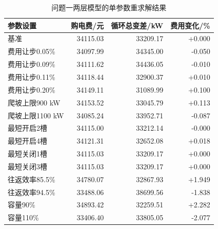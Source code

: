 \begin{table}[H]\centering
\caption{问题一两层模型的单参数重求解结果}\label{tab:q1-sensitivity-final}
\begin{tabular}{lrrr}\toprule
参数设置 & 购电费/元 & 循环总变差/kW & 费用变化/\%\\\midrule
基准 & 34115.03 & 33209.17 & +0.000 \\
费用让步0.05\% & 34097.99 & 34345.00 & -0.050 \\
费用让步0.09\% & 34111.62 & 34436.05 & -0.010 \\
费用让步0.11\% & 34118.44 & 32900.37 & +0.010 \\
费用让步0.20\% & 34149.11 & 31089.99 & +0.100 \\
爬坡上限900 kW & 34153.52 & 33045.79 & +0.113 \\
爬坡上限1100 kW & 34085.24 & 33952.71 & -0.087 \\
最短开启2槽 & 34115.00 & 33212.14 & -0.000 \\
最短开启4槽 & 34121.31 & 32652.08 & +0.018 \\
最短关闭1槽 & 34115.03 & 33209.17 & +0.000 \\
最短关闭3槽 & 34115.03 & 33209.17 & +0.000 \\
往返效率85.5\% & 34780.07 & 32867.93 & +1.949 \\
往返效率94.5\% & 33488.06 & 38699.56 & -1.838 \\
容量90\% & 34893.42 & 32259.51 & +2.282 \\
容量110\% & 33406.40 & 33805.05 & -2.077 \\
\bottomrule\end{tabular}\end{table}
